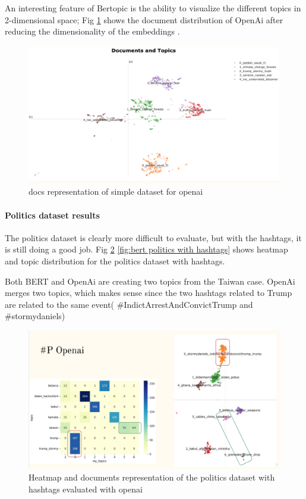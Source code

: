 An interesting feature of Bertopic is the ability to visualize the different topics in 2-dimensional space; Fig \ref{fig:openai docs} shows the document distribution of OpenAi after reducing the dimensionality of the embeddings .

\begin{figure}
    \centering
    \includegraphics[width=1\linewidth]{Chapter4/figures/openai_documents_viz.png}
    \caption{docs representation of simple dataset for openai}
    \label{fig:openai docs}
\end{figure}


\paragraph{Politics dataset results}

The politics dataset is clearly more difficult to evaluate, but with the hashtags, it is still doing a good job. Fig \ref{fig:openai_heat_docs_politics_hash} \ref{fig:bert politics with hashtags} shows heatmap and topic distribution for the politics dataset with hashtags.

 Both BERT and OpenAi are creating two topics from the Taiwan case. OpenAi merges two topics, which makes sense since the two hashtags related to Trump are related to the same event( \#IndictArrestAndConvictTrump and \#stormydaniels) 

\begin{figure}
    \centering
    \includegraphics[width=1\linewidth]{Chapter4/figures/openai_politics_hash_comparison.png}
    \caption{Heatmap and documents representation of the politics dataset with hashtags evaluated with openai}
    \label{fig:openai_heat_docs_politics_hash}
\end{figure}


